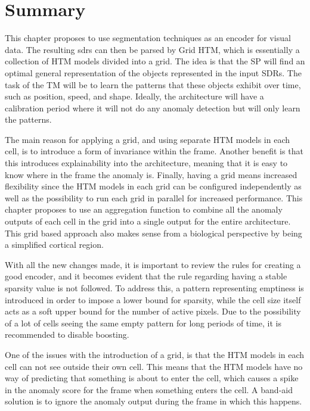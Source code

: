 \section{Summary}
This chapter proposes to use segmentation techniques as an encoder for visual data. The resulting \glspl*{sdr} can then be parsed by Grid HTM, which is essentially a collection of HTM models divided into a grid. The idea is that the SP will find an optimal general representation of the objects represented in the input SDRs. The task of the TM will be to learn the patterns that these objects exhibit over time, such as position, speed, and shape. Ideally, the architecture will have a calibration period where it will not do any anomaly detection but will only learn the patterns.
\par
The main reason for applying a grid, and using separate HTM models in each cell, is to introduce a form of invariance within the frame. Another benefit is that this introduces explainability into the architecture, meaning that it is easy to know where in the frame the anomaly is. Finally, having a grid means increased flexibility since the HTM models in each grid can be configured independently as well as the possibility to run each grid in parallel for increased performance. This chapter proposes to use an aggregation function to combine all the anomaly outputs of each cell in the grid into a single output for the entire architecture. This grid based approach also makes sense from a biological perspective by being a simplified cortical region.
\par
With all the new changes made, it is important to review the rules for creating a good encoder, and it becomes evident that the rule regarding having a stable sparsity value is not followed. To address this, a pattern representing emptiness is introduced in order to impose a lower bound for sparsity, while the cell size itself acts as a soft upper bound for the number of active pixels. Due to the possibility of a lot of cells  seeing the same empty pattern for long periods of time, it is recommended to disable boosting.
\par
One of the issues with the introduction of a grid, is that the HTM models in each cell can not see outside their own cell. This means that the HTM models have no way of predicting that something is about to enter the cell, which causes a spike in the anomaly score for the frame when something enters the cell. A band-aid solution is to ignore the anomaly output during the frame in which this happens.
\par
